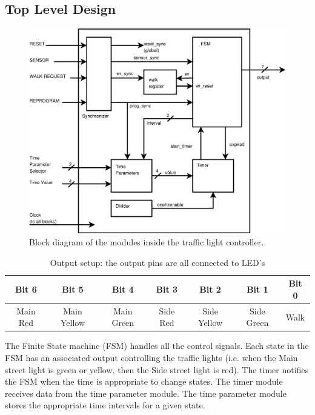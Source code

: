 \documentclass[12pt]{article}
\begin{document}
	\subsection{Top Level Design}

	\begin{figure}[ht]
	\centering
	\includegraphics[scale=0.4]{block.ps}
	\caption{Block diagram of the modules inside the traffic light controller.}
	\label{fig:block}
	\end{figure}

	\begin{table}[ht]
	\caption[Output Setup]{Output setup:  the output pins are all connected to
	LED's}
	\centering
		\begin{tabular}{|c|c|c|c|c|c|c|}
		\hline
		Bit 6 & Bit 5 & Bit 4 & Bit 3 & Bit 2 & Bit 1 & Bit 0 \\ \hline
		Main Red & Main Yellow & Main Green & Side Red & Side Yellow & Side Green & Walk \\ \hline
		\end{tabular}
	\label{tbl:output}
	\end{table}


	The Finite State machine (FSM) handles all the control signals.  Each state in
	the FSM has an associated output controlling the traffic lights (i.e. when
	the Main street light is green or yellow, then the Side street light is red).
	The timer notifies the FSM when the time is appropriate to change states.
	The timer module receives data from the time parameter module.  The time
	parameter module stores the appropriate time intervals for a given state.
\end{document}
